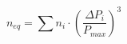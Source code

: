 \documentclass[12pt]{article}
\begin{document}
\begin{displaymath}
n_{eq} = \sum n_i \cdot \left( \frac {\Delta P_i} {P_{max}} \right)^3
\end{displaymath}
\end{document}
